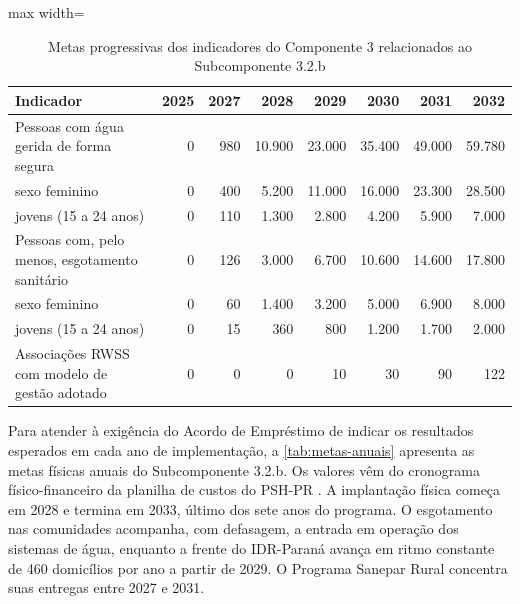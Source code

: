 \begin{table}[htbp]
\centering
\caption{Metas progressivas dos indicadores do Componente 3 relacionados ao Subcomponente 3.2.b}
\label{tab:metas-componente3}
\footnotesize
\renewcommand{\arraystretch}{1.2}
\begin{adjustbox}{max width=\linewidth}
\begin{tabular}{lrrrrrrr}
\toprule
\textbf{Indicador} & \textbf{2025} & \textbf{2027} & \textbf{2028} &
\textbf{2029} & \textbf{2030} & \textbf{2031} & \textbf{2032} \\
\midrule
Pessoas com água gerida de forma segura & 0 & 980 & 10.900 & 23.000 & 35.400 & 49.000 & 59.780 \\
\quad sexo feminino & 0 & 400 & 5.200 & 11.000 & 16.000 & 23.300 & 28.500 \\
\quad jovens (15 a 24 anos) & 0 & 110 & 1.300 & 2.800 & 4.200 & 5.900 & 7.000 \\
Pessoas com, pelo menos, esgotamento sanitário & 0 & 126 & 3.000 & 6.700 & 10.600 & 14.600 & 17.800 \\
\quad sexo feminino & 0 & 60 & 1.400 & 3.200 & 5.000 & 6.900 & 8.000 \\
\quad jovens (15 a 24 anos) & 0 & 15 & 360 & 800 & 1.200 & 1.700 & 2.000 \\
Associações RWSS com modelo de gestão adotado & 0 & 0 & 0 & 10 & 30 & 90 & 122 \\
\bottomrule
\end{tabular}
\end{adjustbox}
\end{table}

Para atender à exigência do Acordo de Empréstimo de indicar os resultados
esperados em cada ano de implementação, a \autoref{tab:metas-anuais} apresenta
as metas físicas anuais do Subcomponente 3.2.b. Os valores vêm do cronograma
físico-financeiro da planilha de custos do PSH-PR \cite{custo2026}. A
implantação física começa em 2028 e termina em 2033, último dos sete anos do
programa. O esgotamento nas
comunidades acompanha, com defasagem, a entrada em operação dos sistemas de
água, enquanto a frente do IDR-Paraná avança em ritmo constante de 460
domicílios por ano a partir de 2029. O Programa Sanepar Rural concentra suas
entregas entre 2027 e 2031.


